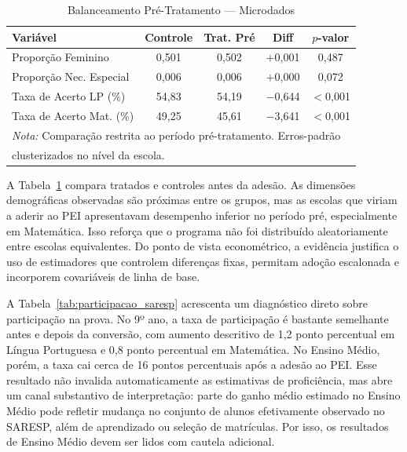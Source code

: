 \begin{table}[htbp]
\centering
\caption{Balanceamento Pré-Tratamento --- Microdados}
\label{tab:balanco}
\begin{tabular}{lcccc}
\toprule
Variável & Controle & Trat. Pré & Diff & $p$-valor \\
\midrule
Proporção Feminino        & 0,501 & 0,502 & $+$0,001 & 0,487 \\
Proporção Nec. Especial   & 0,006 & 0,006 & $+$0,000 & 0,072 \\
Taxa de Acerto LP (\%)    & 54,83 & 54,19 & $-$0,644 & $<$0,001 \\
Taxa de Acerto Mat. (\%)  & 49,25 & 45,61 & $-$3,641 & $<$0,001 \\
\bottomrule
\multicolumn{5}{l}{\footnotesize \textit{Nota:} Comparação restrita ao período pré-tratamento. Erros-padrão} \\
\multicolumn{5}{l}{\footnotesize clusterizados no nível da escola.} \\
\end{tabular}
\end{table}

A Tabela~\ref{tab:balanco} compara tratados e controles antes da adesão. As dimensões demográficas observadas são próximas entre os grupos, mas as escolas que viriam a aderir ao PEI apresentavam desempenho inferior no período pré, especialmente em Matemática. Isso reforça que o programa não foi distribuído aleatoriamente entre escolas equivalentes. Do ponto de vista econométrico, a evidência justifica o uso de estimadores que controlem diferenças fixas, permitam adoção escalonada e incorporem covariáveis de linha de base.

A Tabela~\ref{tab:participacao_saresp} acrescenta um diagnóstico direto sobre participação na prova. No 9º ano, a taxa de participação é bastante semelhante antes e depois da conversão, com aumento descritivo de 1,2 ponto percentual em Língua Portuguesa e 0,8 ponto percentual em Matemática. No Ensino Médio, porém, a taxa cai cerca de 16 pontos percentuais após a adesão ao PEI. Esse resultado não invalida automaticamente as estimativas de proficiência, mas abre um canal substantivo de interpretação: parte do ganho médio estimado no Ensino Médio pode refletir mudança no conjunto de alunos efetivamente observado no SARESP, além de aprendizado ou seleção de matrículas. Por isso, os resultados de Ensino Médio devem ser lidos com cautela adicional.




